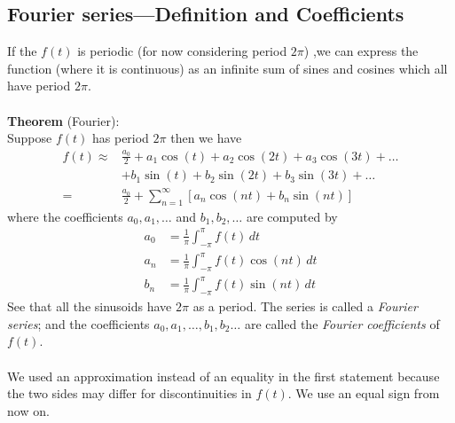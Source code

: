 \documentclass{report}
\begin{document}
\subsection{Fourier series---Definition and Coefficients}
If the $f(t)$ is periodic (for now considering period $2\pi$)
,we can express the function (where it is continuous) as an
infinite sum of sines and cosines which all have period $2\pi$.\\
\vspace{1mm}\\
\textbf{Theorem} (Fourier):\\
Suppose $f(t)$ has period $2\pi$ then we have
\begin{align*}
f(t)\approx&\frac{a_0}{2}+a_1\cos(t)+a_2\cos(2t)+a_3\cos(3t)+\ldots\\
&+b_1\sin(t)+b_2\sin(2t)+b_3\sin(3t)+\ldots\\
=&\frac{a_0}{2}+\sum^{\infty}_{n=1}[a_n\cos(nt)+b_n\sin(nt)]
\end{align*}
where the coefficients $a_0,a_1,\ldots$ and $b_1,b_2,\ldots$ are computed by
\begin{align*}
a_0&=\frac{1}{\pi}\int^\pi_{-\pi}f(t)\,dt\\
a_n&=\frac{1}{\pi}\int^\pi_{-\pi}f(t)\cos(nt)\,dt\\
b_n&=\frac{1}{\pi}\int^\pi_{-\pi}f(t)\sin(nt)\,dt
\end{align*}
See that all the sinusoids have $2\pi$ as a period. The series is called a \textit{Fourier series}; and the
coefficients $a_0,a_1,\ldots,b_1,b_2\ldots$ are called the \textit{Fourier coefficients} of $f(t)$.\\
\vspace{1mm}\\
We used an approximation instead of an equality in the first statement because the two sides may differ 
for discontinuities in $f(t)$. We use an equal sign from now on.
\newpage
\end{document}
